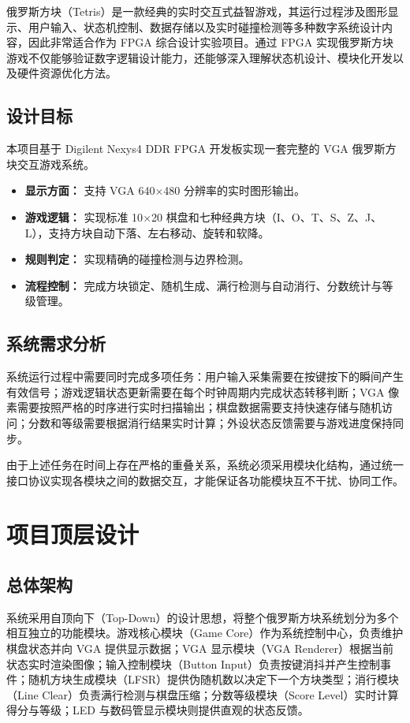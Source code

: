\documentclass[UTF8,zihao=-4]{ctexart}
\begin{document}
俄罗斯方块（Tetris）是一款经典的实时交互式益智游戏，其运行过程涉及图形显示、用户输入、状态机控制、数据存储以及实时碰撞检测等多种数字系统设计内容，因此非常适合作为 FPGA 综合设计实验项目。通过 FPGA 实现俄罗斯方块游戏不仅能够验证数字逻辑设计能力，还能够深入理解状态机设计、模块化开发以及硬件资源优化方法。

\subsection{设计目标}
本项目基于 Digilent Nexys4 DDR FPGA 开发板实现一套完整的 VGA 俄罗斯方块交互游戏系统。
\begin{itemize}
    \item \textbf{显示方面：} 支持 VGA 640$\times$480 分辨率的实时图形输出。
    \item \textbf{游戏逻辑：} 实现标准 10$\times$20 棋盘和七种经典方块（I、O、T、S、Z、J、L），支持方块自动下落、左右移动、旋转和软降。
    \item \textbf{规则判定：} 实现精确的碰撞检测与边界检测。
    \item \textbf{流程控制：} 完成方块锁定、随机生成、满行检测与自动消行、分数统计与等级管理。
\end{itemize}

\subsection{系统需求分析}
系统运行过程中需要同时完成多项任务：用户输入采集需要在按键按下的瞬间产生有效信号；游戏逻辑状态更新需要在每个时钟周期内完成状态转移判断；VGA 像素需要按照严格的时序进行实时扫描输出；棋盘数据需要支持快速存储与随机访问；分数和等级需要根据消行结果实时计算；外设状态反馈需要与游戏进度保持同步。

由于上述任务在时间上存在严格的重叠关系，系统必须采用模块化结构，通过统一接口协议实现各模块之间的数据交互，才能保证各功能模块互不干扰、协同工作。

\section{项目顶层设计}

\subsection{总体架构}
系统采用自顶向下（Top-Down）的设计思想，将整个俄罗斯方块系统划分为多个相互独立的功能模块。游戏核心模块（Game Core）作为系统控制中心，负责维护棋盘状态并向 VGA 提供显示数据；VGA 显示模块（VGA Renderer）根据当前状态实时渲染图像；输入控制模块（Button Input）负责按键消抖并产生控制事件；随机方块生成模块（LFSR）提供伪随机数以决定下一个方块类型；消行模块（Line Clear）负责满行检测与棋盘压缩；分数等级模块（Score Level）实时计算得分与等级；LED 与数码管显示模块则提供直观的状态反馈。
\end{document}
